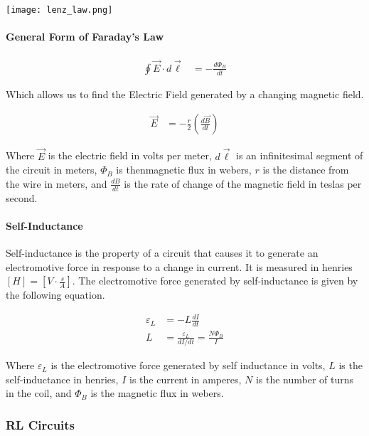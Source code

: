 \begin{center}
    \texttt{[image: lenz\_law.png]}
\end{center}


\paragraph*{General Form of Faraday's Law}

\begin{align*}
    \oint \vec{E} \cdot d\vec{\ell} &= -\frac{d\Phi_B}{dt}
\end{align*}

Which allows us to find the Electric Field generated by a changing magnetic field.

\begin{align*}
    \vec{E} &= -\frac{r}{2}(\frac{d\vec{B}}{dt})
\end{align*}

Where $\vec{E}$ is the electric field in volts per meter, $d\vec{\ell}$ is an infinitesimal segment of the circuit in meters, $\Phi_B$ is thenmagnetic flux in webers, $r$ is the distance from the wire in meters, and $\frac{dB}{dt}$ is the rate of change of the magnetic field in teslas per second.\\


\paragraph*{Self-Inductance}
Self-inductance is the property of a circuit that causes it to generate an electromotive force in response to a change in current. It is measured in henries $[H] = [V\cdot \frac{s}{A}]$. The electromotive force generated by self-inductance is given by the following equation.

\begin{align*}
    \varepsilon_L &= -L\frac{dI}{dt}\\
    L &= \frac{\varepsilon_L}{dI/dt} = \frac{N\Phi_B}{I}
\end{align*}

Where $\varepsilon_L$ is the electromotive force generated by self inductance in volts, $L$ is the self-inductance in henries, $I$ is the current in amperes, $N$ is the number of turns in the coil, and $\Phi_B$ is the magnetic flux in webers.\\

\pagebreak

\subsubsection*{RL Circuits}
